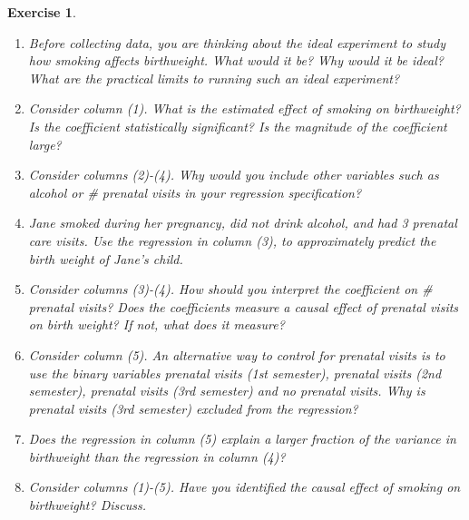\documentclass{article}
\newtheorem{exercise}[theorem]{Exercise}
\begin{document}
\begin{exercise}
\begin{enumerate}[label=(\alph*)]
\item Before collecting data, you are thinking about the ideal experiment to study how smoking affects birthweight. What would it be? Why would it be ideal? What are the practical limits to running such an ideal experiment?
\item Consider column (1). What is the estimated effect of smoking on birthweight? Is the coefficient statistically significant? Is the magnitude of the coefficient large? 
\item Consider columns (2)-(4). Why would you include other variables such as \textit{alcohol} or \textit{\# prenatal visits} in your regression specification?
\item Jane smoked during her pregnancy, did not drink alcohol, and had 3 prenatal care visits. Use the regression in column (3), to approximately predict the birth weight of Jane’s child.
\item  Consider columns (3)-(4). How should you interpret the coefficient on \textit{\# prenatal visits}? Does the coefficients measure a causal effect of prenatal visits on birth weight? If not, what does it measure?
\item Consider column (5). An alternative way to control for prenatal visits is to use the binary variables \textit{prenatal visits (1st semester)},  \textit{prenatal visits (2nd semester)},  \textit{prenatal visits (3rd semester)} and \textit{no prenatal visits}. Why is \textit{prenatal visits (3rd semester)} excluded from the regression?
\item  Does the regression in column (5) explain a larger fraction of the variance in birthweight than the regression in column (4)? 
\item Consider columns (1)-(5). Have you identified the causal effect of smoking on birthweight? Discuss.
\end{enumerate}

\newpage


\end{exercise}
\end{document}
